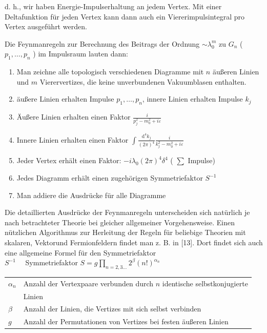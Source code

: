 \documentclass[10pt, letterpaper]{article}
\begin{document}
d. h., wir haben Energie-Impulserhaltung an jedem Vertex. Mit einer Deltafunktion für jeden Vertex kann dann auch ein Viererimpulsintegral pro Vertex ausgeführt werden.

Die Feynmanregeln zur Berechnung des Beitrags der Ordnung $\sim \lambda_{0}^{m}$ zu $G_{n}$ ( $p_{1}, \ldots, p_{n}$ ) im Impulsraum lauten dann:

\begin{enumerate}
  \item Man zeichne alle topologisch verschiedenen Diagramme mit $n$ äußeren Linien und $m$ Vierervertizes, die keine unverbundenen Vakuumblasen enthalten.
  \item äußere Linien erhalten Impulse $p_{1}, \ldots, p_{n}$, innere Linien erhalten Impulse $k_{j}$
  \item Äußere Linien erhalten einen Faktor $\frac{i}{p_{j}^{2}-m_{0}^{2}+i \varepsilon}$
  \item Innere Linien erhalten einen Faktor $\int \frac{\mathrm{d}^{4} k_{j}}{(2 \pi)^{4}} \frac{i}{k_{j}^{2}-m_{0}^{2}+i \varepsilon}$
  \item Jeder Vertex erhält einen Faktor: $-i \lambda_{0}(2 \pi)^{4} \delta^{4}$ ( $\sum$ Impulse)
  \item Jedes Diagramm erhält einen zugehörigen Symmetriefaktor $S^{-1}$
  \item Man addiere die Ausdrücke für alle Diagramme
\end{enumerate}

Die detaillierten Ausdrücke der Feynmanregeln unterscheiden sich natürlich je nach betrachteter Theorie bei gleicher allgemeiner Vorgehensweise. Einen nützlichen Algorithmus zur Herleitung der Regeln für beliebige Theorien mit skalaren, Vektorund Fermionfeldern findet man z. B. in [13]. Dort findet sich auch eine allgemeine Formel für den Symmetriefaktor\\
$S^{-1} \quad$ Symmetriefaktor $S=g \prod_{n=2,3 \ldots} 2^{\beta}(n!)^{\alpha_{n}}$

\begin{center}
\begin{tabular}{ll}
$\alpha_{n}$ & Anzahl der Vertexpaare verbunden durch $n$ identische selbstkonjugierte \\
 & Linien \\
$\beta$ & Anzahl der Linien, die Vertizes mit sich selbst verbinden \\
$g$ & Anzahl der Permutationen von Vertizes bei festen äußeren Linien \\
\end{tabular}
\end{center}
\end{document}
